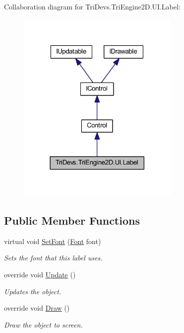Collaboration diagram for Tri\-Devs.\-Tri\-Engine2\-D.\-U\-I.\-Label\-:
\nopagebreak
\begin{figure}[H]
\begin{center}
\leavevmode
\includegraphics[width=222pt]{class_tri_devs_1_1_tri_engine2_d_1_1_u_i_1_1_label__coll__graph}
\end{center}
\end{figure}
\subsection*{Public Member Functions}
\begin{DoxyCompactItemize}
\item 
virtual void \hyperlink{class_tri_devs_1_1_tri_engine2_d_1_1_u_i_1_1_label_a31b2de1912fc33234435806d5a2ef644}{Set\-Font} (\hyperlink{class_tri_devs_1_1_tri_engine2_d_1_1_text_1_1_font}{Font} font)
\begin{DoxyCompactList}\small\item\em Sets the font that this label uses. \end{DoxyCompactList}\item 
override void \hyperlink{class_tri_devs_1_1_tri_engine2_d_1_1_u_i_1_1_label_a97e8c9ee95cedecab10ba505438e0d1b}{Update} ()
\begin{DoxyCompactList}\small\item\em Updates the object. \end{DoxyCompactList}\item 
override void \hyperlink{class_tri_devs_1_1_tri_engine2_d_1_1_u_i_1_1_label_aaa532c9037ca1b51bab8f7eb2673438d}{Draw} ()
\begin{DoxyCompactList}\small\item\em Draw the object to screen. \end{DoxyCompactList}\end{DoxyCompactItemize}
